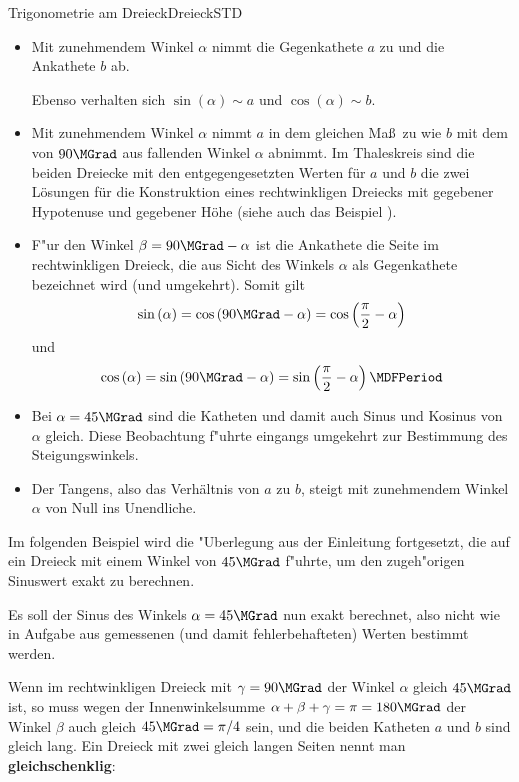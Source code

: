 \begin{MXContent}{Trigonometrie am Dreieck}{Dreieck}{STD}
\begin{itemize}
\item Mit zunehmendem Winkel $\alpha$ nimmt die Gegenkathete $a$ zu und die 
Ankathete $b$ ab.

Ebenso verhalten sich $\sin\left(\alpha\right)\sim a$ und 
$\cos\left(\alpha\right)\sim b$.

\item Mit zunehmendem Winkel $\alpha$ nimmt $a$ in dem gleichen Ma\ss\ zu 
wie $b$ mit dem von $90\MGrad$ aus fallenden Winkel $\alpha$ abnimmt. Im 
Thaleskreis sind die beiden Dreiecke mit den entgegengesetzten Werten 
f\"ur $a$ und $b$ die zwei L\"osungen f\"ur die Konstruktion eines 
rechtwinkligen Dreiecks mit gegebener Hypotenuse und gegebener H\"ohe 
(siehe auch das Beispiel ).

\item
F"ur den Winkel $\beta = 90\MGrad - \alpha$ ist die Ankathete die Seite im
rechtwinkligen Dreieck, die aus Sicht des Winkels $\alpha$ als Gegenkathete
bezeichnet wird (und umgekehrt). Somit gilt
\[
\sin\left(\alpha\right)=\cos\left(90\MGrad-\alpha\right) %
 = \cos\left(\frac{\pi}{2}-\alpha\right) %
\]
und 
\[
\cos\left(\alpha\right) = \sin\left(90\MGrad-\alpha\right) %
 = \sin\left(\frac{\pi}{2}-\alpha\right) \MDFPeriod %
\]
%
\item Bei $\alpha=45\MGrad$ sind die Katheten und damit auch Sinus und Kosinus 
von $\alpha$ gleich. Diese Beobachtung f"uhrte eingangs umgekehrt zur Bestimmung
des Steigungswinkels.

\item Der Tangens, also das Verh\"altnis von $a$ zu $b$, steigt mit zunehmendem 
Winkel $\alpha$ von Null ins {\glqq}Unendliche{\grqq}. 
\end{itemize}

Im folgenden Beispiel wird die "Uberlegung aus der Einleitung fortgesetzt, 
die auf ein Dreieck mit einem Winkel von $45\MGrad$ f"uhrte, um den zugeh"origen
Sinuswert exakt zu berechnen.

\begin{MExample}
Es soll der Sinus des Winkels $\alpha=45\MGrad$ nun exakt berechnet, also 
nicht wie in Aufgabe  aus 
gemessenen (und damit fehlerbehafteten) Werten bestimmt werden.

Wenn im rechtwinkligen Dreieck mit $\gamma=90\MGrad$ der Winkel $\alpha$ gleich $45\MGrad$ ist, so muss wegen der Innenwinkelsumme $\alpha+\beta+\gamma=\pi=180\MGrad$ der Winkel $\beta$ auch gleich $45\MGrad=\pi/4$ sein, und die beiden Katheten $a$ und $b$ sind gleich lang. Ein Dreieck mit zwei gleich langen Seiten nennt man \textbf{gleichschenklig}:


\end{MExample}
\end{MXContent}
